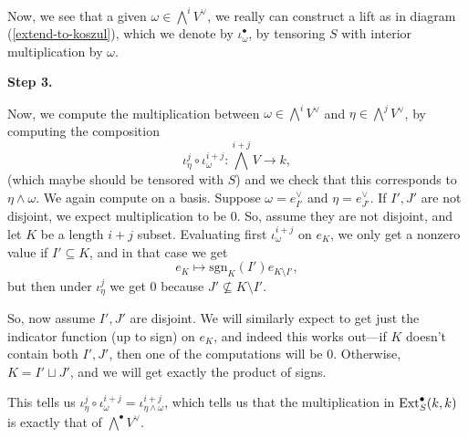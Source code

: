 \documentclass[12pt]{article}
\newcommand{\sgn}{\mathrm{sgn}}
\begin{document}
Now, we see that a given $\omega \in \bigwedge^i V^\vee$, we really can construct a lift as in diagram (\ref{extend-to-koszul}), which we denote by $\iota^\bullet_\omega$, by tensoring $S$ with interior multiplication by $\omega$.

\textbf{Step 3.}

Now, we compute the multiplication between $\omega\in \bigwedge^i V^\vee$ and $\eta\in \bigwedge^j V^\vee$, by computing the composition
\[\iota_\eta^{j} \circ \iota_\omega^{i+j}: \bigwedge^{i+j} V \to k,\]
(which maybe should be tensored with $S$) and we check that this corresponds to $\eta \wedge \omega$. We again compute on a basis. Suppose $\omega = e_{I'}^\vee$ and $\eta = e_{J'}^\vee$. If $I',J'$ are not disjoint, we expect multiplication to be 0. So, assume they are not disjoint, and let $K$ be a length $i+j$ subset. Evaluating first $\iota_\omega^{i+j}$ on $e_K$, we only get a nonzero value if $I'\subseteq K$, and in that case we get
\[e_K \mapsto \sgn_K(I') e_{K\setminus I'},\]
but then under $\iota_\eta^{j}$ we get 0 because $J'\not\subseteq K\setminus I'$.

So, now assume $I',J'$ are disjoint. We will similarly expect to get just the indicator function (up to sign) on $e_K$, and indeed this works out---if $K$ doesn't contain both $I',J'$, then one of the computations will be 0. Otherwise, $K=I' \sqcup J'$, and we will get exactly the product of signs.

This tells us $\iota_\eta^{j} \circ \iota_\omega^{i+j} = \iota_{\eta \wedge \omega}^{i+j}$, which tells us that the multiplication in $\mathrm{Ext}_S^\bullet(k,k)$ is exactly that of $\bigwedge^\bullet V^\vee$.
\end{document}
